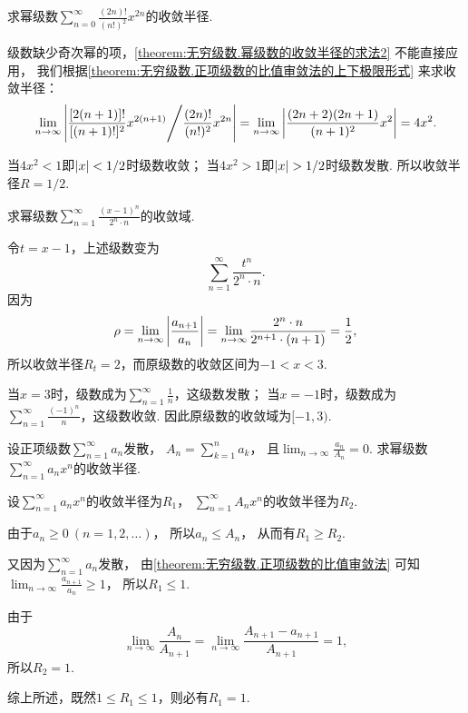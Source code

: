 \begin{example}
求幂级数\(\sum_{n=0}^\infty \frac{(2n)!}{(n!)^2} x^{2n}\)的收敛半径.
\begin{solution}
级数缺少奇次幂的项，\cref{theorem:无穷级数.幂级数的收敛半径的求法2} 不能直接应用，
我们根据\cref{theorem:无穷级数.正项级数的比值审敛法的上下极限形式} 来求收敛半径：
\[
	\lim_{n\to\infty} \abs{
		{\frac{[2(n+1)]!}{[(n+1)!]^2} x^{2(n+1)}}
		\Bigg/
		{\frac{(2n)!}{(n!)^2} x^{2n}}
	}
	= \lim_{n\to\infty} \abs{\frac{(2n+2)(2n+1)}{(n+1)^2} x^2}
	= 4 x^2.
\]

当\(4 x^2 < 1\)即\(\abs{x} < 1/2\)时级数收敛；
当\(4 x^2 > 1\)即\(\abs{x} > 1/2\)时级数发散.
所以收敛半径\(R = 1/2\).
\end{solution}
\end{example}

\begin{example}
求幂级数\(\sum_{n=1}^\infty \frac{(x-1)^n}{2^n \cdot n}\)的收敛域.
\begin{solution}
令\(t = x-1\)，上述级数变为\[
	\sum_{n=1}^\infty \frac{t^n}{2^n \cdot n}.
\]
因为\[
	\rho
	= \lim_{n\to\infty} \abs{\frac{a_{n+1}}{a_n}}
	= \lim_{n\to\infty} \frac{2^n \cdot n}{2^{n+1} \cdot (n+1)}
	= \frac{1}{2},
\]
所以收敛半径\(R_t = 2\)，而原级数的收敛区间为\(-1<x<3\).

当\(x=3\)时，级数成为\(\sum_{n=1}^\infty \frac{1}{n}\)，这级数发散；
当\(x=-1\)时，级数成为\(\sum_{n=1}^\infty \frac{(-1)^n}{n}\)，这级数收敛.
因此原级数的收敛域为\([-1,3)\).
\end{solution}
\end{example}

\begin{example}
设正项级数\(\sum_{n=1}^\infty a_n\)发散，
\(A_n = \sum_{k=1}^n a_k\)，
且\(\lim_{n\to\infty} \frac{a_n}{A_n} = 0\).
求幂级数\(\sum_{n=1}^\infty a_n x^n\)的收敛半径.
\begin{solution}
设\(\sum_{n=1}^\infty a_n x^n\)的收敛半径为\(R_1\)，
\(\sum_{n=1}^\infty A_n x^n\)的收敛半径为\(R_2\).

由于\(a_n\geq0\ (n=1,2,\dotsc)\)，
所以\(a_n \leq A_n\)，
从而有\(R_1 \geq R_2\).

又因为\(\sum_{n=1}^\infty a_n\)发散，
由\cref{theorem:无穷级数.正项级数的比值审敛法} 可知
\(\lim_{n\to\infty} \frac{a_{n+1}}{a_n} \geq 1\)，
所以\(R_1 \leq 1\).

由于\[
	\lim_{n\to\infty} \frac{A_n}{A_{n+1}}
	= \lim_{n\to\infty} \frac{A_{n+1} - a_{n+1}}{A_{n+1}}
	= 1,
\]
所以\(R_2=1\).

综上所述，既然\(1 \leq R_1 \leq 1\)，则必有\(R_1=1\).
\end{solution}
\end{example}

